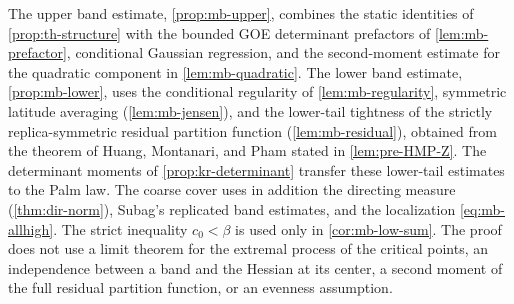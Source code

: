 \begin{remark}\label{rem:mb-scope}
The upper band estimate, \cref{prop:mb-upper}, combines the static identities of \cref{prop:th-structure} with the bounded GOE determinant prefactors of \cref{lem:mb-prefactor}, conditional Gaussian regression, and the second-moment estimate for the quadratic component in \cref{lem:mb-quadratic}. The lower band estimate, \cref{prop:mb-lower}, uses the conditional regularity of \cref{lem:mb-regularity}, symmetric latitude averaging (\cref{lem:mb-jensen}), and the lower-tail tightness of the strictly replica-symmetric residual partition function (\cref{lem:mb-residual}), obtained from the theorem of Huang, Montanari, and Pham stated in \cref{lem:pre-HMP-Z}. The determinant moments of \cref{prop:kr-determinant} transfer these lower-tail estimates to the Palm law. The coarse cover uses in addition the directing measure (\cref{thm:dir-norm}), Subag's replicated band estimates, and the localization \eqref{eq:mb-allhigh}. The strict inequality $c_0<\beta$ is used only in \cref{cor:mb-low-sum}. The proof does not use a limit theorem for the extremal process of the critical points, an independence between a band and the Hessian at its center, a second moment of the full residual partition function, or an evenness assumption.
\end{remark}
